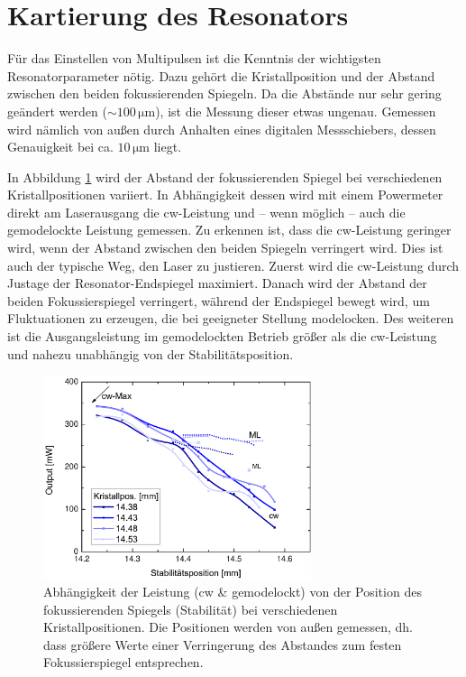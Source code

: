 \documentclass[bachelor,       %
               twoside,        %
               BCOR10mm,       %
               english,ngerman, %
               ]{GAUBM}
\begin{document}
\section{Kartierung des Resonators}
Für das Einstellen von Multipulsen ist die Kenntnis der wichtigsten Resonatorparameter nötig.
Dazu gehört die Kristallposition und der Abstand zwischen den beiden fokussierenden Spiegeln.
Da die Abstände nur sehr gering geändert werden ($\sim 100\,\si{\micro\meter}$), ist die Messung dieser etwas ungenau.
Gemessen wird nämlich von außen durch Anhalten eines digitalen Messschiebers, dessen Genauigkeit  bei ca. $10\,\si{\micro\meter}$ liegt.

In Abbildung \ref{fig:map} wird der Abstand der fokussierenden Spiegel bei verschiedenen Kristallpositionen variiert.
In Abhängigkeit dessen wird mit einem Powermeter direkt am Laserausgang die cw-Leistung und -- wenn möglich -- auch die gemodelockte Leistung gemessen.
Zu erkennen ist, dass die cw-Leistung geringer wird, wenn der Abstand zwischen den beiden Spiegeln verringert wird.
Dies ist auch der typische Weg, den Laser zu justieren.
Zuerst wird die cw-Leistung durch Justage der Resonator-Endspiegel maximiert.
Danach wird der Abstand der beiden Fokussierspiegel verringert, während der Endspiegel bewegt wird, um Fluktuationen zu erzeugen, die bei geeigneter Stellung modelocken.
Des weiteren ist die Ausgangsleistung im gemodelockten Betrieb größer als die cw-Leistung und nahezu unabhängig von der Stabilitätsposition.


\begin{figure}[!htb]
	\centering
	\includegraphics[width=0.7\textwidth]{figures/map.pdf}
	\caption{Abhängigkeit der Leistung (cw \& gemodelockt) von der Position des fokussierenden Spiegels (Stabilität) bei verschiedenen Kristallpositionen.
	Die Positionen werden von außen gemessen, dh. dass größere Werte einer Verringerung des Abstandes zum festen Fokussierspiegel entsprechen.}
	\label{fig:map}
\end{figure}
\end{document}
